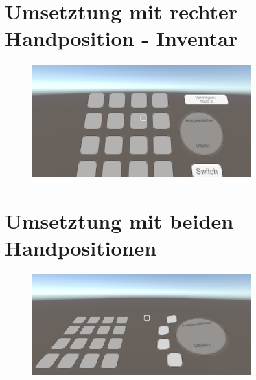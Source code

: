 	\section{Umsetztung mit rechter Handposition - Inventar}
	\begin{figure}[htbp]
		\centering
		\includegraphics[width=0.75\textwidth]{Fragen/UmsetzungR2.png}
	\end{figure}
	\newpage
	
	\section{Umsetztung mit beiden Handpositionen}
	\begin{figure}[htbp]
		\centering
		\includegraphics[width=0.75\textwidth]{Fragen/UmsetzungB1.png}
	\end{figure}